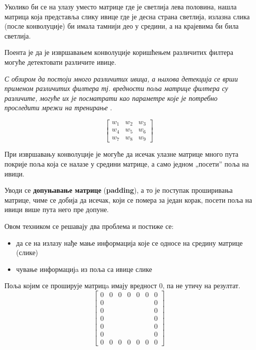 \documentclass[12pt, а4paper]{article}
\begin{document}
Уколико би се на улазу уместо матрице где је светлија лева половина, 
нашла матрица која представља слику ивице где је десна страна светлија, излазна
слика (после конволуције) би имала тамнији део у средини, а на крајевима
би била светлија.

Поента је да је извршавањем конволуције коришћењем различитих филтера могуће
детектовати различите ивице.

\textit{С обзиром да постоји много различитих ивица, а њихова детекција се врши
применом различитих филтера тј. вредности поља матрице филтера су различите,
могуће их је посматрати као параметре које је потребно
проследити мрежи на тренирање} \cite{ngMoreEdge}.

\begin{equation}
\begin{bmatrix}
 w_1 & w_2 & w_3 \\
 w_4 & w_5 & w_6 \\
 w_7 & w_8 & w_9
\end{bmatrix}
\label{eq:KonvMatrica}
\end{equation}

При извршавању конволуције је могуће да исечак улазне матрице много пута
покрије поља која се налазе у средини матрице, а само једном „посети” поља
на ивици.

Уводи се \textbf{допуњавање матрице} (\textbf{padding}), а то је поступак
проширивања матрице, чиме се добија да исечак, који се помера за један
корак, посети поља на ивици више пута него пре допуне.

Овом техником се решавају два проблема и постиже се:
\begin{itemize}
 \item да се на излазу нађе мање информација које се односе на средину матрице (слике)
 \item чување информацијa из поља са ивице слике
\end{itemize}

Поља којим се проширује матрицa имају вредност 0, па не утичу на резултат.
\begin{equation}
\begin{bmatrix}
 0 & 0 & 0 & 0 & 0 & 0 & 0 \\
 0 &   &   &   &   &   & 0 \\
 0 &   &   &   &   &   & 0 \\
 0 &   &   &   &   &   & 0 \\
 0 &   &   &   &   &   & 0 \\
 0 &   &   &   &   &   & 0 \\
 0 & 0 & 0 & 0 & 0 & 0 & 0
\end{bmatrix}
\label{eq:KonvMatricaPadd}
\end{equation}
\end{document}
